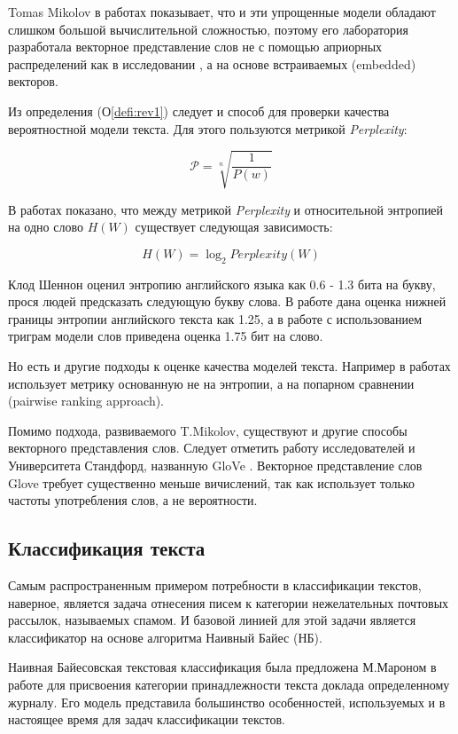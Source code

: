 Tomas Mikolov в работах \cite{mikolov2013efficient,mikolov2013distributed} показывает, что и эти упрощенные модели обладают слишком большой вычислительной сложностью, поэтому его лаборатория разработала векторное представление слов не с помощью априорных распределений как в исследовании \cite{blei2006dynamic}, а на основе встраиваемых (embedded) векторов. 

Из определения (О\ref{defi:rev1}) следует и способ для проверки качества вероятностной модели текста. Для этого пользуются метрикой \textit{Perplexity}: 

\[ 
\mathcal{P}  = \sqrt[n]{\frac{1}{P(w)}}
\]

В работах \cite{cover1991entropy, algoet1988asymptotic} показано, что между метрикой \textit{Perplexity} и относительной энтропией на одно слово $  H(W)$ существует следующая зависимость: 

\[
 H(W) = \log_2 Perplexity(W) 
\]

Клод Шеннон \cite{shannon1951prediction} оценил энтропию  английского языка как 0.6 - 1.3 бита на букву, прося людей предсказать следующую букву слова. 
В работе \cite{cover1978convergent} дана оценка нижней границы энтропии английского текста как 1.25, а в работе \cite{brown1992estimate} с использованием триграм модели слов приведена оценка 1.75 бит на слово.  

Но есть и другие подходы к оценке качества моделей текста. Например в работах \cite{cohen1998learning, collobert2011natural} использует метрику основанную не на энтропии, а на попарном сравнении (pairwise ranking approach).

Помимо подхода, развиваемого T.Mikolov, существуют и другие способы векторного представления слов. Следует отметить работу исследователей и Университета Стандфорд, названную GloVe \cite{pennington2014glove}. Векторное представление слов Glove требует существенно меньше вичислений, так как использует только частоты употребления слов, а не вероятности.  

\subsection{Классификация текста}
\label{sec:textclassification}
Самым распространенным примером потребности в классификации текстов, наверное, является задача отнесения писем к категории нежелательных почтовых рассылок, называемых спамом. И базовой линией для этой задачи является классификатор на основе алгоритма Наивный Байес (НБ).

Наивная Байесовская текстовая классификация была предложена М.Мароном в работе \cite{maron1961automatic} для присвоения категории принадлежности текста доклада определенному журналу. 
Его модель представила большинство особенностей, используемых и в настоящее время для задач классификации текстов. 

